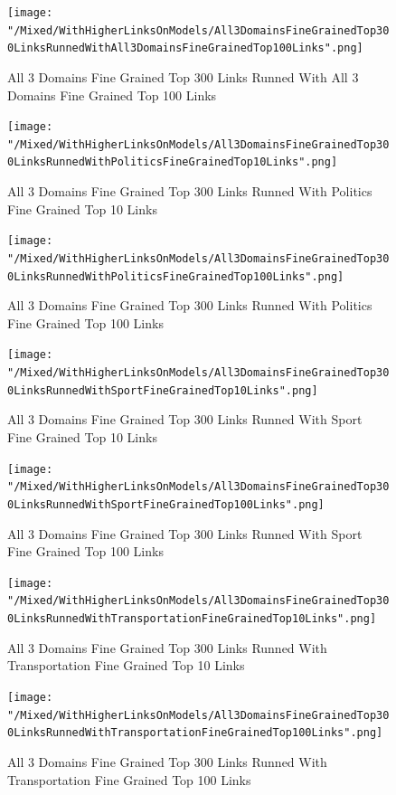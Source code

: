 \documentclass[thesis=M,english]{FITthesis}[2018/05/30]
\begin{document}
	\begin{figure}[H]\centering
		\texttt{[image: "/Mixed/WithHigherLinksOnModels/All3DomainsFineGrainedTop300LinksRunnedWithAll3DomainsFineGrainedTop100Links".png]}
		\caption{All 3 Domains Fine Grained Top 300 Links Runned With All 3 Domains Fine Grained Top 100 Links}\label{}
	\end{figure}
	
	\begin{figure}[H]\centering
		\texttt{[image: "/Mixed/WithHigherLinksOnModels/All3DomainsFineGrainedTop300LinksRunnedWithPoliticsFineGrainedTop10Links".png]}
		\caption{All 3 Domains Fine Grained Top 300 Links Runned With Politics Fine Grained Top 10 Links}\label{}
	\end{figure}
		
	\begin{figure}[H]\centering
		\texttt{[image: "/Mixed/WithHigherLinksOnModels/All3DomainsFineGrainedTop300LinksRunnedWithPoliticsFineGrainedTop100Links".png]}
		\caption{All 3 Domains Fine Grained Top 300 Links Runned With Politics Fine Grained Top 100 Links}\label{}
	\end{figure}
	
	\begin{figure}[H]\centering
		\texttt{[image: "/Mixed/WithHigherLinksOnModels/All3DomainsFineGrainedTop300LinksRunnedWithSportFineGrainedTop10Links".png]}
		\caption{All 3 Domains Fine Grained Top 300 Links Runned With Sport Fine Grained Top 10 Links}\label{}
	\end{figure}
				
	\begin{figure}[H]\centering
		\texttt{[image: "/Mixed/WithHigherLinksOnModels/All3DomainsFineGrainedTop300LinksRunnedWithSportFineGrainedTop100Links".png]}
		\caption{All 3 Domains Fine Grained Top 300 Links Runned With Sport Fine Grained Top 100 Links}\label{}
	\end{figure}
	
	\begin{figure}[H]\centering
		\texttt{[image: "/Mixed/WithHigherLinksOnModels/All3DomainsFineGrainedTop300LinksRunnedWithTransportationFineGrainedTop10Links".png]}
		\caption{All 3 Domains Fine Grained Top 300 Links Runned With Transportation Fine Grained Top 10 Links}\label{}
	\end{figure}
	
	\begin{figure}[H]\centering
		\texttt{[image: "/Mixed/WithHigherLinksOnModels/All3DomainsFineGrainedTop300LinksRunnedWithTransportationFineGrainedTop100Links".png]}
		\caption{All 3 Domains Fine Grained Top 300 Links Runned With Transportation Fine Grained Top 100 Links}\label{}
	\end{figure}
	
\end{document}
